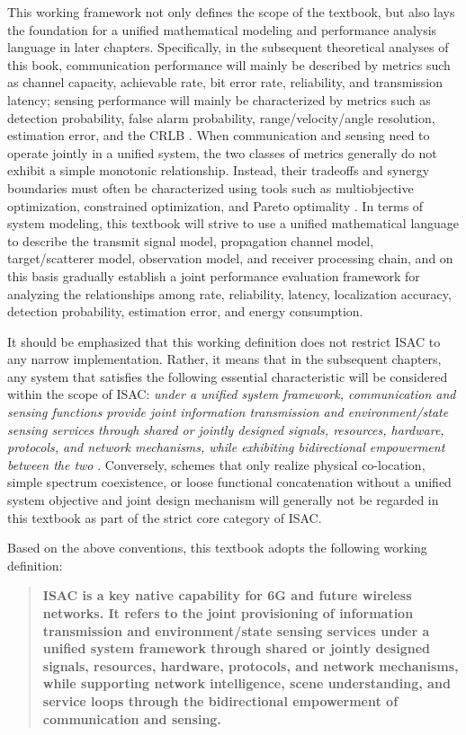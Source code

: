 This working framework not only defines the scope of the textbook, but also lays the foundation for a unified mathematical modeling and performance analysis language in later chapters. Specifically, in the subsequent theoretical analyses of this book, communication performance will mainly be described by metrics such as channel capacity, achievable rate, bit error rate, reliability, and transmission latency; sensing performance will mainly be characterized by metrics such as detection probability, false alarm probability, range/velocity/angle resolution, estimation error, and the CRLB \cite{Liu2022ISAC,Zhang2021ISAC6G}. When communication and sensing need to operate jointly in a unified system, the two classes of metrics generally do not exhibit a simple monotonic relationship. Instead, their tradeoffs and synergy boundaries must often be characterized using tools such as multiobjective optimization, constrained optimization, and Pareto optimality \cite{Liu2020JointRadarComm}. In terms of system modeling, this textbook will strive to use a unified mathematical language to describe the transmit signal model, propagation channel model, target/scatterer model, observation model, and receiver processing chain, and on this basis gradually establish a joint performance evaluation framework for analyzing the relationships among rate, reliability, latency, localization accuracy, detection probability, estimation error, and energy consumption.

It should be emphasized that this working definition does not restrict ISAC to any narrow implementation. Rather, it means that in the subsequent chapters, any system that satisfies the following essential characteristic will be considered within the scope of ISAC: \emph{under a unified system framework, communication and sensing functions provide joint information transmission and environment/state sensing services through shared or jointly designed signals, resources, hardware, protocols, and network mechanisms, while exhibiting bidirectional empowerment between the two} \cite{Liu2022ISAC,Gonzalez2024integrated}. Conversely, schemes that only realize physical co-location, simple spectrum coexistence, or loose functional concatenation without a unified system objective and joint design mechanism will generally not be regarded in this textbook as part of the strict core category of ISAC.

Based on the above conventions, this textbook adopts the following working definition:
\begin{quote}
\textbf{ISAC is a key native capability for 6G and future wireless networks. It refers to the joint provisioning of information transmission and environment/state sensing services under a unified system framework through shared or jointly designed signals, resources, hardware, protocols, and network mechanisms, while supporting network intelligence, scene understanding, and service loops through the bidirectional empowerment of communication and sensing.}
\end{quote}


